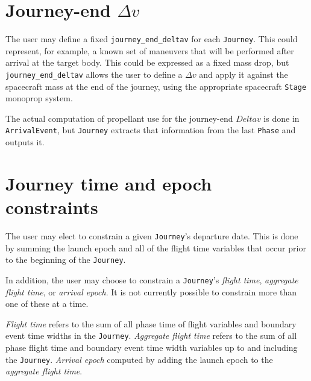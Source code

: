 \section{Journey-end $\Delta v$}
\label{sec:journey_end_deltav}

The user may define a fixed \texttt{journey\_end\_deltav} for each \texttt{Journey}. This could represent, for example, a known set of maneuvers that will be performed after arrival at the target body. This could be expressed as a fixed mass drop, but \texttt{journey\_end\_deltav} allows the user to define a $\Delta v$ and apply it against the spacecraft mass at the end of the journey, using the appropriate spacecraft \texttt{Stage} monoprop system.

The actual computation of propellant use for the journey-end $Delta v$ is done in \texttt{ArrivalEvent}, but \texttt{Journey} extracts that information from the last \texttt{Phase} and outputs it.

\section{Journey time and epoch constraints}
\label{sec:journey_time_and_epoch_constraints}

The user may elect to constrain a given \texttt{Journey}'s departure date. This is done by summing the launch epoch and all of the flight time variables that occur prior to the beginning of the \texttt{Journey}.

In addition, the user may choose to constrain a \texttt{Journey}'s \textit{flight time}, \textit{aggregate flight time}, or \textit{arrival epoch}. It is not currently possible to constrain more than one of these at a time.

\textit{Flight time} refers to the sum of all phase time of flight variables and boundary event time widths in the \texttt{Journey}. \textit{Aggregate flight time} refers to the sum of all phase flight time and boundary event time width variables up to and including the \texttt{Journey}. \textit{Arrival epoch} computed by adding the launch epoch to the \textit{aggregate flight time}.